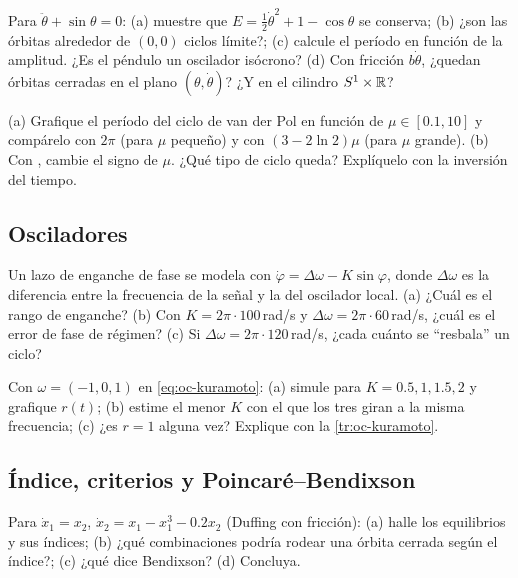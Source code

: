 \begin{problema}[el péndulo]\label{prob:oc-pendulo}
Para $\ddot\theta+\sin\theta=0$: (a) muestre que $E=\tfrac12\dot\theta^2+1-\cos\theta$ se conserva; (b) ¿son las órbitas alrededor de $(0,0)$ ciclos límite?; (c) \etiquetaM{} calcule el período en función de la amplitud. ¿Es el péndulo un oscilador isócrono? (d) Con fricción $b\dot\theta$, ¿quedan órbitas cerradas en el plano $(\theta,\dot\theta)$? ¿Y en el cilindro $S^1\times\mathbb{R}$?
\end{problema}

\begin{problema}\label{prob:oc-vdp}
\etiquetaM{} (a) Grafique el período del ciclo de van der Pol en función de $\mu\in[0.1,10]$ y compárelo con $2\pi$ (para $\mu$ pequeño) y con $(3-2\ln2)\mu$ (para $\mu$ grande). (b) Con , cambie el signo de $\mu$. ¿Qué tipo de ciclo queda? Explíquelo con la inversión del tiempo.
\end{problema}

\subsection*{Osciladores}

\begin{problema}[un PLL]\label{prob:oc-pll}
Un lazo de enganche de fase se modela con $\dot\varphi=\Delta\omega-K\sin\varphi$, donde $\Delta\omega$ es la diferencia entre la frecuencia de la señal y la del oscilador local. (a) ¿Cuál es el rango de enganche? (b) Con $K=2\pi\cdot100$\,rad/s y $\Delta\omega=2\pi\cdot60$\,rad/s, ¿cuál es el error de fase de régimen? (c) Si $\Delta\omega=2\pi\cdot120$\,rad/s, ¿cada cuánto se ``resbala'' un ciclo?
\end{problema}

\begin{problema}[Kuramoto con $N=3$]\label{prob:oc-kur3}
\etiquetaM{} Con $\omega=(-1,0,1)$ en \eqref{eq:oc-kuramoto}: (a) simule para $K=0.5,1,1.5,2$ y grafique $r(t)$; (b) estime el menor $K$ con el que los tres giran a la misma frecuencia; (c) ¿es $r=1$ alguna vez? Explique con la \cref{tr:oc-kuramoto}.
\end{problema}

\subsection*{Índice, criterios y Poincaré--Bendixson}

\begin{problema}\label{prob:oc-indice}
Para $\dot x_1=x_2$, $\dot x_2=x_1-x_1^3-0.2x_2$ (Duffing con fricción): (a) halle los equilibrios y sus índices; (b) ¿qué combinaciones podría rodear una órbita cerrada según el índice?; (c) ¿qué dice Bendixson? (d) Concluya.
\end{problema}

